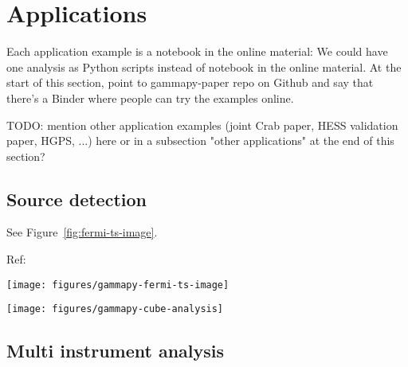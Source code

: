 \section{Applications}
\label{sec:apps}

Each application example is a notebook in the online material: We could have one
analysis as Python scripts instead of notebook in the online material. At the
start of this section, point to gammapy-paper repo on Github and say that
there’s a Binder where people can try the examples online.

TODO: mention other application examples (joint Crab paper, HESS validation
paper, HGPS, ...) here or in a subsection "other applications" at the end of
this section?

\subsection{Source detection}
\label{apps:detect}

See Figure~\ref{fig:fermi-ts-image}.

Ref: \citep{Stewart2009}

\begin{figure*}[t]
\centering
\texttt{[image: figures/gammapy-fermi-ts-image]}
\caption{
Gammapy application example: A \textit{Fermi} survey TS map of the inner
Galactic plane region.
}
\label{fig:fermi-ts-image}
\end{figure*}

\begin{figure*}[t]
\centering
\texttt{[image: figures/gammapy-cube-analysis]}
\caption{
Gammapy data model illustration. Binned analysis of lon-lat-energy cube data is
supported via joint likelihood analysis of one image per energy bin.
On-off-region based spectral analysis is supported as well.
}
\label{fig:data-model}
\end{figure*}

\subsection{Multi instrument analysis}

